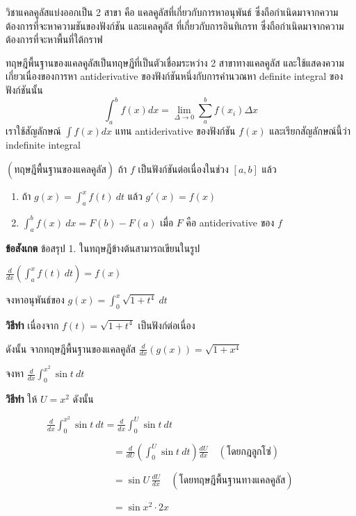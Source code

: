 \documentclass[
]{book}
\begin{document}
วิชาแคลคูลัสแบ่งออกเป็น 2 สาขา คือ แคลคูลัสที่เกี่ยวกับการหาอนุพันธ์
ซึ่งถือกำเนิดมาจากความต้องการที่จะหาความชันของฟังก์ชัน และแคลคูลัส ที่เกี่ยวกับการอินทิเกรท
ซึ่งถือกำเนิดมาจากความต้องการที่จะหาพื้นที่ใต้กราฟ

ทฤษฎีพื้นฐานของแคลคูลัสเป็นทฤษฎีที่เป็นตัวเชื่อมระหว่าง 2 สาขาทางแคลคูลัส
และใช้แสดงความเกี่ยวเนื่องของการหา antiderivative ของฟังก์ชันหนึ่งกับการคำนวณหา
definite integral ของฟังก์ชันนั้น
\[\int^b_af(x)dx= \lim\limits_{\Delta\rightarrow 0}\sum_a^bf(x_i)\Delta x\]
เราใช้สัญลักษณ์ \(\int f(x)dx\) แทน antiderivative ของฟังก์ชัน \(f(x)\)
และเรียกสัญลักษณ์นี้ว่า indefinite integral

\(( \mbox{ทฤษฎีพื้นฐานของแคลคูลัส})\) ถ้า \(f\) เป็นฟังก์ชันต่อเนื่องในช่วง \([a,b]\)
แล้ว

\begin{enumerate}
\def\labelenumi{\arabic{enumi}.}
\item
  ถ้า \(\displaystyle g(x)=\int_{a}^{x}f(t) \ dt\) แล้ว \(g'(x)=f(x)\)
\item
  \(\displaystyle \int_{a}^{b}f(x) \ dx=F(b)-F(a)\) เมื่อ \(F\) คือ
  antiderivative ของ \(f\)
\end{enumerate}

\textbf{ข้อสังเกต} ข้อสรุป 1. ในทฤษฎีข้างต้นสามารถเขียนในรูป

\(\displaystyle \frac{d}{dx}\left(\int_{a}^{x}f(t) \ dt\right)=f(x)\)

จงหาอนุพันธ์ของ \(\displaystyle
g(x)=\int_{0}^{x}\sqrt{1+t^{4}} \ dt\)

\textbf{วิธีทำ} เนื่องจาก \(\displaystyle f(t)=\sqrt{1+t^{4}}\) เป็นฟังก์ต่อเนื่อง

ดังนั้น จากทฤษฎีพื้นฐานของแคลคูลัส \(\displaystyle
\frac{d}{dx}\left(g(x)\right)=\sqrt{1+x^{4}}\)

จงหา \(\displaystyle \frac{d}{dx}\int_{0}^{x^{2}}\sin t \ dt\)

\textbf{วิธีทำ} ให้ \(U=x^{2}\) ดังนั้น

\(\qquad \qquad \ \displaystyle \frac{d}{dx}\int_{0}^{x^{2}}\sin t \ dt
=\frac{d}{dx}\int_{0}^{U}\sin t \ dt\)

\(\qquad \qquad \qquad \qquad \qquad \quad =\displaystyle
\frac{d}{dU}\left(\int_{0}^{U}\sin t \ dt\right) \frac{dU}{dx} \quad (
\mbox{โดยกฎลูกโซ่})\)

\(\qquad \qquad \qquad \qquad \qquad \quad =\displaystyle \sin U \,
\frac{dU}{dx} \quad ( \mbox{โดยทฤษฎีพื้นฐานทางแคลคูลัส} )\)

\(\qquad \qquad \qquad \qquad \qquad \quad =\displaystyle \sin x^{2}\cdot 2x\)
\end{document}
